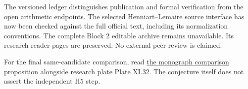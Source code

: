The versioned ledger distinguishes publication and formal verification from the open arithmetic endpoints. The selected Henniart--Lemaire source interface has now been checked against the full official text, including its normalization conventions. The complete Block 2 editable archive remains unavailable. Its research-reader pages are preserved. No external peer review is claimed.

For the final same-candidate comparison, read \href{https://komorebi.invalid/b07/visual_comparison}{the monograph comparison proposition} alongside \href{https://komorebi.invalid/b07/visual_v32}{research plate Plate XI.32}. The conjecture itself does not assert the independent H5 step.
